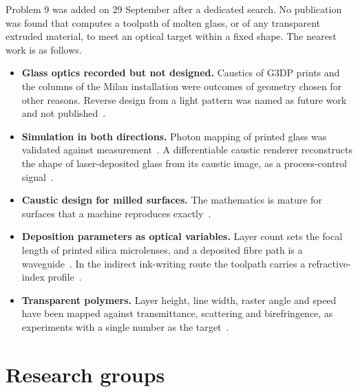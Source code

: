 \documentclass[10pt,a4paper]{article}
\begin{document}
Problem 9 was added on 29 September after a dedicated search. No publication was found that computes a toolpath of molten glass, or of any transparent extruded material, to meet an optical target within a fixed shape. The nearest work is as follows.

\begin{itemize}
  \item \textbf{Glass optics recorded but not designed.} Caustics of G3DP prints and the columns of the Milan installation were outcomes of geometry chosen for other reasons. Reverse design from a light pattern was named as future work and not published~\citep{klein2015,inamura2018,inglessis2017glass2}.
  \item \textbf{Simulation in both directions.} Photon mapping of printed glass was validated against measurement~\citep{weber2020photon}. A differentiable caustic renderer reconstructs the shape of laser-deposited glass from its caustic image, as a process-control signal~\citep{kassubeck2021caustics}.
  \item \textbf{Caustic design for milled surfaces.} The mathematics is mature for surfaces that a machine reproduces exactly~\citep{papas2011caustics,yue2014caustics,schwartzburg2014caustics}.
  \item \textbf{Deposition parameters as optical variables.} Layer count sets the focal length of printed silica microlenses, and a deposited fibre path is a waveguide~\citep{kth2024microlens,kranert2020waveguide}. In the indirect ink-writing route the toolpath carries a refractive-index profile~\citep{dyllaspears2020grin,sage2026fermat}.
  \item \textbf{Transparent polymers.} Layer height, line width, raster angle and speed have been mapped against transmittance, scattering and birefringence, as experiments with a single number as the target~\citep{kumar2024transparency,vochozka2024translucency,hamp2021transmittance,ren2023anisotropy}.
\end{itemize}

\section{Research groups}
\end{document}
